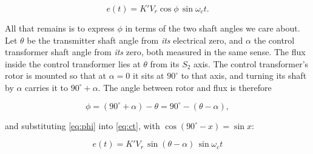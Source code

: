 \documentclass[11pt,a4paper]{article}
\begin{document}
\begin{equation}
  e(t)=K'V_{r}\cos\phi\,\sin\omega_{c}t.
  \label{eq:ct}
\end{equation}

All that remains is to express $\phi$ in terms of the two shaft angles we
care about. Let $\theta$ be the transmitter shaft angle from \emph{its}
electrical zero, and $\alpha$ the control transformer shaft angle from
\emph{its} zero, both measured in the same sense. The flux inside the control
transformer lies at $\theta$ from its $S_{2}$ axis. The control transformer's
rotor is mounted so that at $\alpha=0$ it sits at $90^\circ$ to that axis, and
turning its shaft by $\alpha$ carries it to $90^\circ+\alpha$. The angle
between rotor and flux is therefore

\begin{equation}
  \phi=(90^\circ+\alpha)-\theta=90^\circ-(\theta-\alpha),
  \label{eq:phi}
\end{equation}

and substituting \eqref{eq:phi} into \eqref{eq:ct}, with
$\cos(90^\circ-x)=\sin x$:

\begin{equation}
  \boxed{\;e(t)=K'V_{r}\,\sin(\theta-\alpha)\,\sin\omega_{c}t\;}
  \label{eq:synchro}
\end{equation}
\end{document}
